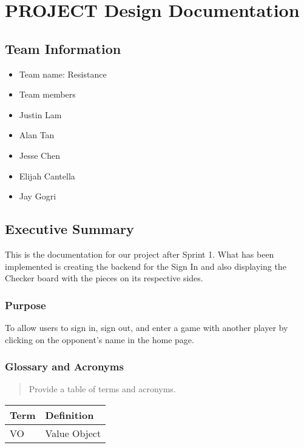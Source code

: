\documentclass[]{article}
\date{}
\providecommand{\tightlist}{%
  \setlength{\itemsep}{0pt}\setlength{\parskip}{0pt}}
\begin{document}
\section{PROJECT Design
Documentation}\label{project-design-documentation}

\subsection{Team Information}\label{team-information}

\begin{itemize}
\tightlist
\item
  Team name: Resistance
\item
  Team members
\item
  Justin Lam
\item
  Alan Tan
\item
  Jesse Chen
\item
  Elijah Cantella
\item
  Jay Gogri
\end{itemize}

\subsection{Executive Summary}\label{executive-summary}

This is the documentation for our project after Sprint 1. What has been
implemented is creating the backend for the Sign In and also displaying
the Checker board with the pieces on its respective sides.

\subsubsection{Purpose}\label{purpose}

To allow users to sign in, sign out, and enter a game with another
player by clicking on the opponent's name in the home page.

\subsubsection{Glossary and Acronyms}\label{glossary-and-acronyms}

\begin{quote}
Provide a table of terms and acronyms.
\end{quote}

\begin{longtable}[]{@{}ll@{}}
\toprule
Term & Definition\tabularnewline
\midrule
\endhead
VO & Value Object\tabularnewline
\bottomrule
\end{longtable}
\end{document}
